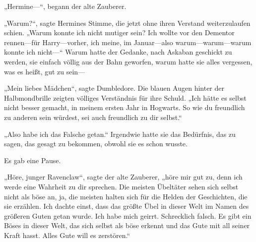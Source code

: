 „Hermine—“, begann der alte Zauberer.

„Warum?“, sagte Hermines Stimme, die jetzt ohne ihren Verstand weiterzulaufen schien. „Warum konnte ich nicht mutiger sein? Ich wollte vor den Dementor rennen—für Harry—vorher, ich meine, im Januar—also warum—warum—warum konnte ich nicht—“
Warum hatte der Gedanke, nach Askaban geschickt zu werden, sie einfach völlig aus der Bahn geworfen, warum hatte sie alles vergessen, was es heißt, gut zu sein—

„Mein liebes Mädchen“, sagte Dumbledore. Die blauen Augen hinter der Halbmondbrille zeigten völliges Verständnis für ihre Schuld. „Ich hätte es selbst nicht besser gemacht, in meinem ersten Jahr in Hogwarts. So wie du freundlich zu anderen sein würdest, sei auch freundlich zu dir selbst.“

„Also habe ich das Falsche getan.“
Irgendwie hatte sie das Bedürfnis, das zu sagen, das gesagt zu bekommen, obwohl sie es schon wusste.

Es gab eine Pause.

„Höre, junger Ravenclaw“, sagte der alte Zauberer, „höre mir gut zu, denn ich werde eine Wahrheit zu dir sprechen. Die meisten Übeltäter sehen sich selbst nicht als böse an, ja, die meisten halten sich für die Helden der Geschichten, die sie erzählen. Ich dachte einst, dass das größte Übel in dieser Welt im Namen des größeren Guten getan wurde. Ich habe mich geirrt. Schrecklich falsch. Es gibt ein Böses in dieser Welt, das sich selbst als böse erkennt und das Gute mit all seiner Kraft hasst. Alles Gute will es zerstören.“

